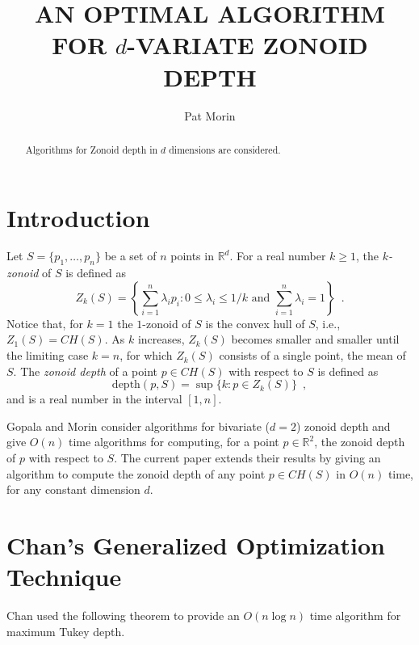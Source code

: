 \documentclass[lotsofwhite]{patmorin}
\title{\MakeUppercase{An Optimal Algorithm
	for} $d$\MakeUppercase{-Variate Zonoid Depth}}
\author{Pat Morin}
\date{}
\newcommand{\CH}{\mathit{CH}}
\newcommand{\Z}{\mathit{Z}}
\newcommand{\depth}{\mathrm{depth}}
\begin{document}
\maketitle
\begin{abstract}
Algorithms for Zonoid depth in $d$ dimensions are considered.
\end{abstract}

\section{Introduction}

Let $S=\{p_1,\ldots,p_n\}$ be a set of $n$ points in $\mathbb{R}^d$.
For a real number $k\ge 1$, the \emph{$k$-zonoid} of $S$ is defined as 
\[
      \Z_k(S) = \left\{\sum_{i=1}^n \lambda_ip_i 
	: \mbox{$0\le \lambda_i\le 1/k$ 
	   and $\sum_{i=1}^n\lambda_i = 1$}  \right\} \enspace .
\] 
Notice that, for $k=1$ the $1$-zonoid of $S$ is the convex hull of
$S$,  i.e., $\Z_1(S)=\CH(S)$.
As $k$ increases, $\Z_k(S)$ becomes smaller and smaller until
the limiting case $k=n$, for which $\Z_k(S)$ consists of a single point,
the mean of $S$.  The \emph{zonoid depth} of a point
$p\in\CH(S)$ with respect to $S$ is defined as
\[
     \depth(p,S) = \sup\{k : p\in Z_k(S) \} \enspace ,
\]
and is a real number in the interval $[1,n]$.

Gopala and Morin \cite{gm06} consider algorithms for bivariate ($d=2$)
zonoid depth and give $O(n)$ time algorithms for computing, for a
point $p\in \mathbb{R}^2$, the zonoid depth of $p$ with respect to
$S$.  The current paper extends their results by giving an algorithm
to compute the zonoid depth of any point $p\in\CH(S)$ in $O(n)$ time,
for any constant dimension $d$.

\section{Chan's Generalized Optimization Technique}

Chan \cite{c2004} used the following theorem to provide an $O(n\log
n)$ time algorithm for maximum Tukey depth.
\end{document}
